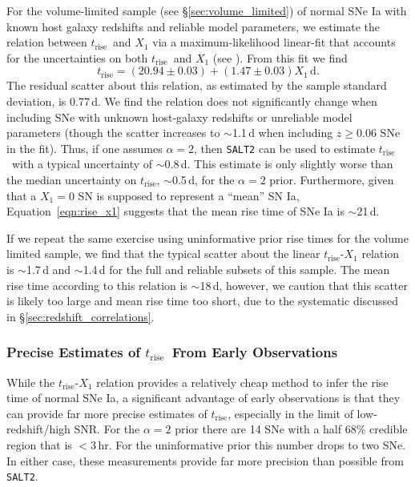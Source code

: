 \documentclass[twocolumn]{./aastex63}
\newcommand{\trise}{$t_\mathrm{rise}$}
\begin{document}
For the volume-limited sample (see \S\ref{sec:volume_limited}) of normal SNe Ia
with known host galaxy redshifts and reliable model parameters, we estimate the
relation between \trise\ and $X_1$ via a maximum-likelihood linear-fit that
accounts for the uncertainties on both \trise\ and $X_1$ (see \citealt{Hogg10}).
From this fit we find
%
\begin{equation}
    t_\mathrm{rise} = (20.94 \pm 0.03) + (1.47 \pm 0.03)X_1\,\mathrm{d}.
    \label{eqn:rise_x1}
\end{equation} 
%
The residual scatter about this relation, as estimated by the sample standard
deviation, is 0.77\,d. We find the relation does not significantly change when
including SNe with unknown host-galaxy redshifts or unreliable model parameters
(though the scatter increases to $\sim$1.1\,d when including $z \ge 0.06$ SNe in
the fit). Thus, if one assumes $\alpha = 2$, then \texttt{SALT2} can be used to
estimate \trise\ with a typical uncertainty of $\sim$0.8\,d. This estimate is
only slightly worse than the median uncertainty on \trise, $\sim$0.5\,d, for the
$\alpha = 2$ prior. Furthermore, given that a $X_1 = 0$ SN is supposed to
represent a ``mean'' SN Ia, Equation~\ref{eqn:rise_x1} suggests that the mean
rise time of SNe Ia is $\sim$21\,d.

If we repeat the same exercise using uninformative prior rise times for the
volume limited sample, we find that the typical scatter about the linear
\trise-$X_1$ relation is $\sim$1.7\,d and $\sim$1.4\,d for the full and reliable
subsets of this sample. The mean rise time according to this relation is
$\sim$18\,d, however, we caution that this scatter is likely too large and mean
rise time too short, due to the systematic discussed in
\S\ref{sec:redshift_correlations}.

\subsubsection{Precise Estimates of \trise\ From Early Observations}

While the \trise-$X_1$ relation provides a relatively cheap method to infer the
rise time of normal SNe Ia, a significant advantage of early observations is
that they can provide far more precise estimates of \trise, especially in the
limit of low-redshift/high SNR. For the $\alpha = 2$ prior there are 14 SNe with
a half 68\% credible region that is $< 3$\,hr. For the uninformative prior this
number drops to two SNe. In either case, these measurements provide far more
precision than possible from \texttt{SALT2}.
\end{document}
